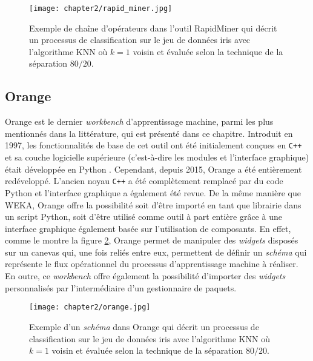 \begin{figure}[H]
	\centering
	\texttt{[image: chapter2/rapid\_miner.jpg]}
        \caption{Exemple de chaîne d'opérateurs dans l'outil RapidMiner qui décrit un processus de classification sur le jeu de données iris avec l'algorithme \acs{KNN} où $k=1$ voisin et évaluée selon la technique de la séparation $80/20$.}
	\label{fig:rapid_miner}
\end{figure}

\subsection{Orange}

Orange est le dernier \textit{workbench} d'apprentissage machine, parmi les plus mentionnés dans la littérature, qui est présenté dans ce chapitre. Introduit en 1997, les fonctionnalités de base de cet outil ont été initialement conçues en \verb!C++! et sa couche logicielle supérieure (c'est-à-dire les modules et l'interface graphique) était développée en Python \citep{Demsar2004,Demsar2013}. Cependant, depuis 2015, Orange a été entièrement redéveloppé. L'ancien noyau \verb!C++! a été complètement remplacé par du code Python et l'interface graphique a également été revue. De la même manière que \acs{WEKA}, Orange offre la possibilité soit d'être importé en tant que librairie dans un script Python, soit d'être utilisé comme outil à part entière grâce à une interface graphique également basée sur l'utilisation de composants. En effet, comme le montre la figure \ref{fig:orange}, Orange permet de manipuler des \emph{widgets} disposés sur un canevas qui, une fois reliés entre eux, permettent de définir un \emph{schéma} qui représente le flux opérationnel du processus d'apprentissage machine à réaliser. En outre, ce \textit{workbench} offre également la possibilité d'importer des \emph{widgets} personnalisés par l'intermédiaire d'un gestionnaire de paquets.

\begin{figure}[H]
	\centering
	\texttt{[image: chapter2/orange.jpg]}
        \caption{Exemple d'un \emph{schéma} dans Orange qui décrit un processus de classification sur le jeu de données iris avec l'algorithme \acs{KNN} où $k=1$ voisin et évaluée selon la technique de la séparation $80/20$.}
	\label{fig:orange}
\end{figure}

